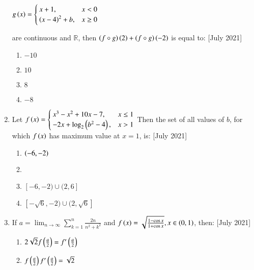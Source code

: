 \documentclass[journal]{IEEEtran}
\begin{document}
\begin{enumerate}
        $ g\left(x\right) = 
        \begin{cases}
            x+1 , &x<0 \\
            \left(x-4\right)^2 + b,&x\geq 0
        \end{cases}
        $
    
     are continuous and $\mathbb{R}$, then $\left(f \circ g\right)\left(2\right) + \left(f\circ g\right)\left(-2\right)$ is equal to: \hfill{[July 2021]}
    \begin{multicols}{2}
        \begin{enumerate}
            \item $-10$
            \item $10$
            \item $8$
            \item $-8$
        \end{enumerate}
    \end{multicols}
    \item Let $
        f\left(x\right) = 
            \begin{cases}
                x^3 - x^2 + 10x - 7, &x\leq 1 \\
                -2x + \log_{2} \left(b^2 - 4\right),&x>1
            \end{cases}
        $
        Then the set of all values of $b$, for which $f\left(x\right)$ has maximum value at $x=1$, is: \hfill{[July 2021]}
        \begin{multicols}{2}
            \begin{enumerate}
                \item $\left(-6,-2\right)$
                \item {}
                \item $[-6,-2)\cup(2,6]$
                \item $[-\sqrt{6},-2)\cup(2,\sqrt{6}]$
            \end{enumerate}
        \end{multicols}
        \item If $a = \lim_{n \to \infty} \sum_{k=1}^{n} \frac{2n}{n^2 + k^2}$ and $f\left(x\right) = \sqrt{\frac{1 - \cos{x}}{1 + \cos{x}}},x \in \left(0,1\right)$, then: \hfill{[July 2021]}
        \begin{multicols}{2}
            \begin{enumerate}
                \item $2\sqrt{2}f\left(\frac{a}{2}\right) = f^{\prime}\left(\frac{a}{2}\right)$
                \item $f\left(\frac{a}{2}\right) f^{\prime}\left(\frac{a}{2}\right) = \sqrt{2}$

\end{enumerate}
\end{multicols}
\end{enumerate}
\end{document}
